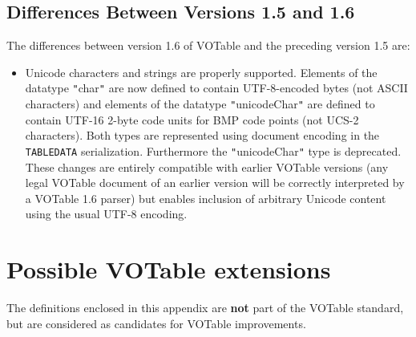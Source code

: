 \documentclass[11pt,a4paper]{ivoa}
\let\fg=\color
\def\elem#1{{\tt{\fg{DarkRed}#1}}}
\def\literalvalue#1{{\tt"}{{\fg{DarkPurple}#1}}{\tt"}}
\begin{document}
{{{\subsection{Differences Between Versions 1.5 and 1.6}
\label{diff1.5-1.6}
The differences between version 1.6 of VOTable and the preceding
version 1.5 are:

\begin{itemize}
\item Unicode characters and strings are properly supported.
      Elements of the datatype \literalvalue{char} are now defined to
      contain UTF-8-encoded bytes (not ASCII characters)
      and elements of the datatype \literalvalue{unicodeChar} are
      defined to contain UTF-16 2-byte code units for BMP code points
      (not UCS-2 characters).
      Both types are represented using document encoding in the 
      \elem{TABLEDATA} serialization.
      Furthermore the \literalvalue{unicodeChar} type is deprecated.
      These changes are entirely compatible with earlier VOTable versions
      (any legal VOTable document of an earlier version
      will be correctly interpreted by a VOTable 1.6 parser)
      but enables inclusion of arbitrary Unicode content
      using the usual UTF-8 encoding.
\end{itemize}





\clearpage
\appendix
{}

\bigskip

\section{Possible VOTable extensions}
The definitions enclosed in this appendix
are {\bf not} part of the VOTable standard, but are considered as candidates
for VOTable improvements.


}}}
\end{document}
